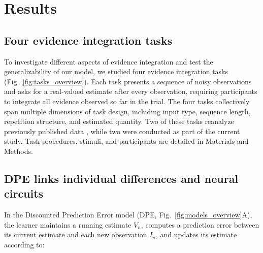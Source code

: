 \documentclass[12pt]{article}
\begin{document}

\section{Results}

\subsection{Four evidence integration tasks}
To investigate different aspects of evidence integration and test the generalizability of our model, we studied four evidence integration tasks (Fig.~\ref{fig:tasks_overview}). Each task presents a sequence of noisy observations and asks for a real-valued estimate after every observation, requiring participants to integrate all evidence observed so far in the trial. The four tasks collectively span multiple dimensions of task design, including input type, sequence length, repetition structure, and estimated quantity. Two of these tasks reanalyze previously published data \cite{prat2024imprecise, yoo2025people}, while two were conducted as part of the current study. Task procedures, stimuli, and participants are detailed in Materials and Methods.

\subsection{DPE links individual differences and neural circuits}
In the Discounted Prediction Error model (DPE, Fig.~\ref{fig:models_overview}A), the learner maintains a running estimate $V_n$, computes a prediction error between its current estimate and each new observation $I_n$, and updates its estimate according to:
\end{document}
